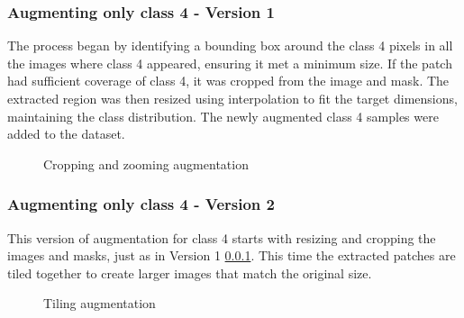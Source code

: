 \documentclass[11pt]{article}
\begin{document}
\begin{multicols}{2}
        \subsubsection{Augmenting only class 4 - Version 1}
        \label{sec:augv1}
        The process began by identifying a bounding box around the class 4 pixels in all the images where class 4 appeared, ensuring it met a minimum size. If the patch had sufficient coverage of class 4, it was cropped from the image and mask. The extracted region was then resized using interpolation to fit the target dimensions, maintaining the class distribution. The newly augmented class 4 samples were added to the dataset.
        \begin{figure}[H]
        \centering
        \caption{Cropping and zooming augmentation}
        \label{fig:aug1}
        \end{figure}

        \subsubsection{Augmenting only class 4 - Version 2}
        \label{sec:augv2}
        This version of augmentation for class 4 starts with resizing and cropping the images and masks, just as in Version 1 \ref{sec:augv1}. This time the extracted patches are tiled together to create larger images that match the original size. 

        \begin{figure}[H]
        \centering
        \caption{Tiling augmentation}
        \label{fig:final_aug}
        \end{figure}


\end{multicols}
\end{document}

